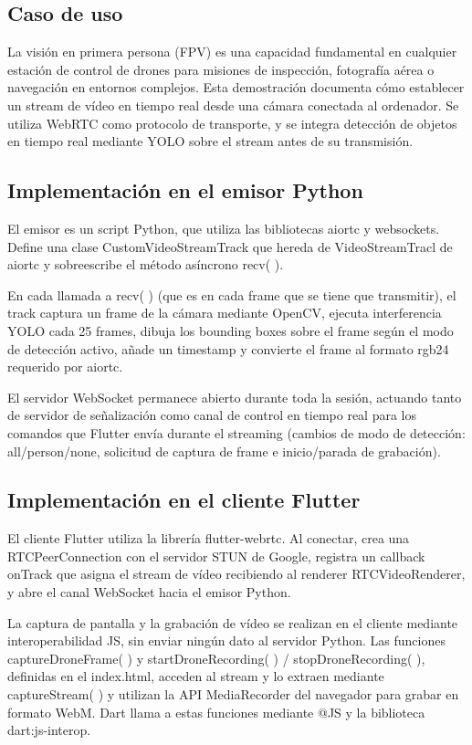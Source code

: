 \subsection{Caso de uso}
La visión en primera persona (FPV) es una capacidad fundamental en cualquier estación de control de drones para misiones de inspección, fotografía aérea o navegación en entornos complejos. Esta demostración documenta cómo establecer un stream de vídeo en tiempo real desde una cámara conectada al ordenador. Se utiliza WebRTC como protocolo de transporte, y se integra detección de objetos en tiempo real mediante YOLO sobre el stream antes de su transmisión.

\subsection{Implementación en el emisor Python}
El emisor es un script Python, que utiliza las bibliotecas aiortc y websockets. Define una clase CustomVideoStreamTrack que hereda de VideoStreamTracl de aiortc y sobreescribe el método asíncrono recv( ).

En cada llamada a recv( ) (que es en cada frame que se tiene que transmitir), el track captura un frame de la cámara mediante OpenCV, ejecuta interferencia YOLO cada 25 frames, dibuja los bounding boxes sobre el frame según el modo de detección activo, añade un timestamp y convierte el frame al formato rgb24 requerido por aiortc.

El servidor WebSocket permanece abierto durante toda la sesión, actuando tanto de servidor de señalización como canal de control en tiempo real para los comandos que Flutter envía durante el streaming (cambios de modo de detección: all/person/none, solicitud de captura de frame e inicio/parada de grabación).

\subsection{Implementación en el cliente Flutter}
El cliente Flutter utiliza la librería flutter-webrtc. Al conectar, crea una RTCPeerConnection con el servidor STUN de Google, registra un callback onTrack que asigna el stream de vídeo recibiendo al renderer RTCVideoRenderer, y abre el canal WebSocket hacia el emisor Python.

La captura de pantalla y la grabación de vídeo se realizan en el cliente mediante interoperabilidad JS, sin enviar ningún dato al servidor Python. Las funciones captureDroneFrame( ) y startDroneRecording( ) / stopDroneRecording( ), definidas en el index.html, acceden al stream y lo extraen mediante captureStream( ) y utilizan la API MediaRecorder del navegador para grabar en formato WebM. Dart llama a estas funciones mediante @JS y la biblioteca dart:js-interop.

